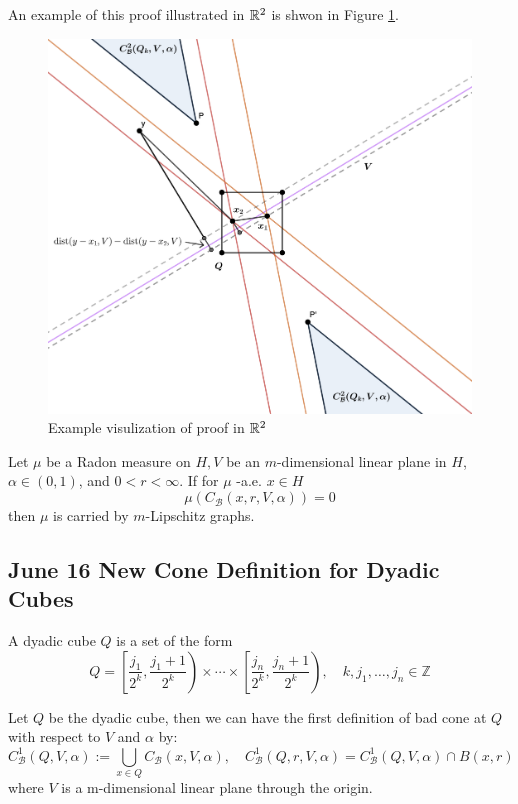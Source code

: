 An example of this proof illustrated in $\mathbb{R}^2$ is shwon in Figure \ref{fig:CB1=CB2}.

\begin{figure}[H]
    \centering
    \includegraphics[width=.6\textwidth]{images/CB1=CB2.png}
    \caption{Example visulization of proof in $\mathbb{R}^2$}
    \label{fig:CB1=CB2}
\end{figure}


\begin{corollary}\label{LisaCoro7.1}
    Let $\mu$ be a Radon measure on $H, V$ be an $m$-dimensional linear plane in $H$, $\alpha \in(0,1)$, and $0<r<\infty$. If for $\mu$ -a.e. $x \in H$
   $$
   \mu\left(C_{\mathcal{B}}(x, r, V, \alpha)\right)=0
   $$
   then $\mu$ is carried by $m$-Lipschitz graphs.
\end{corollary}




\newpage
\subsection{June 16 New Cone Definition for Dyadic Cubes}
\begin{definition} A dyadic cube $Q$ is a set of the form
    \begin{equation}\label{equ:dyadiccube}
        Q=\left[\frac{j_{1}}{2^{k}}, \frac{j_{1}+1}{2^{k}}\right) \times \cdots \times\left[\frac{j_{n}}{2^{k}}, \frac{j_{n}+1}{2^{k}}\right), \quad k, j_{1}, \ldots, j_{n} \in \mathbb{Z}
    \end{equation}
\end{definition}

\begin{definition} Let $Q$ be the dyadic cube, then we can have the first definition of bad cone at $Q$ with respect to $V$ and $\alpha$ by:
    $$C^1_{\mathcal{B}}(Q, V, \alpha) := \bigcup_{x\in Q} C_\mathcal{B}(x, V, \alpha), \quad C^1_{\mathcal{B}}(Q, r, V, \alpha) = C^1_{\mathcal{B}}(Q, V, \alpha) \cap B(x,r)$$
    where $V$ is a m-dimensional linear plane through the origin. 
\end{definition}

